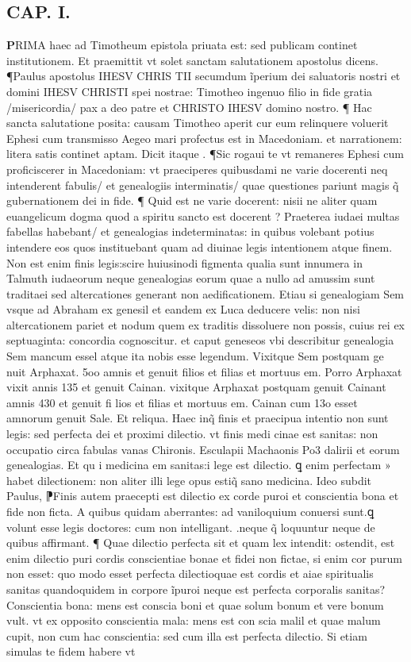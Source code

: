 \documentclass{article}
\begin{document}
\begin{pages}
\section{CAP. I.}\pstart \huge\textbf{P}\normalsize RIMA haec ad Timotheum epistola priuata est: sed publicam continet institutionem. Et praemittit vt solet sanctam salutationem apostolus dicens. ¶Paulus apostolus IHESV CHRIS TII secumdum ĩperium dei saluatoris nostri et domini IHESV CHRISTI spei nostrae: Timotheo ingenuo filio in fide gratia /misericordia/ pax a deo patre et CHRISTO IHESV domino nostro. ¶ Hac sancta salutatione posita: causam Timotheo aperit cur eum relinquere voluerit Ephesi cum transmisso Aegeo mari profectus est in Macedoniam. et narrationem: litera satis continet aptam. Dicit itaque . ¶Sic rogaui te vt remaneres Ephesi cum proficiscerer in Macedoniam: vt praeciperes quibusdami ne varie docerenti neq intenderent fabulis/ et genealogiis interminatis/ quae questiones pariunt magis q̃ gubernationem dei in fide. ¶ Quid est ne varie docerent: nisii ne aliter quam euangelicum dogma quod a spiritu sancto est docerent ? Praeterea iudaei multas fabellas habebant/ et genealogias indeterminatas: in quibus volebant potius intendere eos quos instituebant quam ad diuinae legis intentionem atque finem. Non est enim finis legis:scire huiusinodi figmenta qualia sunt innumera in Talmuth iudaeorum neque  genealogias eorum quae a nullo ad amussim sunt traditaei sed altercationes generant non aedificationem. Etiau si genealogiam Sem vsque ad Abraham ex genesil et eandem ex Luca deducere velis: non nisi altercationem pariet et nodum quem ex traditis dissoluere non possis, cuius rei ex septuaginta: concordia cognoscitur. et caput geneseos vbi describitur genealogia Sem mancum essel atque ita nobis esse legendum. Vixitque Sem postquam ge nuit Arphaxat. 5oo amnis et genuit filios et filias et mortuus em. Porro Arphaxat vixit annis 135 et genuit Cainan. vixitque Arphaxat postquam genuit Cainant amnis 430 et genuit fi lios et filias et mortuus em. Cainan cum 13o esset amnorum genuit Sale. Et reliqua. Haec inq̃ finis et praecipua intentio non sunt legis: sed perfecta dei et proximi dilectio. vt finis medi cinae est sanitas: non occupatio circa fabulas vanas Chironis. Esculapii Machaonis Po3 dalirii et eorum genealogias. Et qu i medicina em sanitas:i lege est dilectio. ꝗ enim perfectam » habet dilectionem: non aliter illi lege opus estiq̃ sano medicina. Ideo subdit Paulus, ⁋Finis autem praecepti est dilectio ex corde puroi et conscientia bona et fide non ficta. A quibus quidam aberrantes: ad vaniloquium conuersi sunt.ꝗ volunt esse legis doctores: cum non intelligant. .neque q̃ loquuntur neque de quibus affirmant. ¶ Quae dilectio perfecta sit et quam lex intendit: ostendit, est enim dilectio puri cordis conscientiae bonae et fidei non fictae, si enim cor purum non esset: quo modo esset perfecta dilectioquae est cordis et aiae spiritualis sanitas quandoquidem in corpore ĩpuroi neque est perfecta corporalis sanitas? Conscientia bona: mens est conscia boni et quae solum bonum et vere bonum vult. vt ex opposito conscientia mala: mens est con scia malil et quae malum cupit, non cum hac conscientia: sed cum illa est perfecta dilectio. Si etiam simulas te fidem habere vt 
\end{pages}
\end{document}
